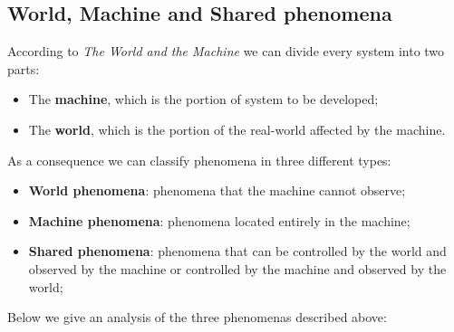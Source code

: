 \documentclass[../RASD.tex]{subfiles}
\begin{document}
        \subsection{World, Machine and Shared phenomena}\label{subsec:world,-machine-and-shared-phenomena}
        According to \textit{The World and the Machine} we can divide every system into two parts:
        \begin{itemize}
            \item The \textbf{machine}, which is the portion of system to be developed;
            \item The \textbf{world}, which is the portion of the real-world affected by the machine.
        \end{itemize}
        As a consequence we can classify phenomena in three different types:
        \begin{itemize}
            \item \textbf{World phenomena}: phenomena that the machine cannot observe;
            \item \textbf{Machine phenomena}: phenomena located entirely in the machine;
            \item \textbf{Shared phenomena}: phenomena that can be controlled by the world and observed by the machine or controlled by the machine and observed by the world;
        \end{itemize}
        Below we give an analysis of the three phenomenas described above:
\end{document}
